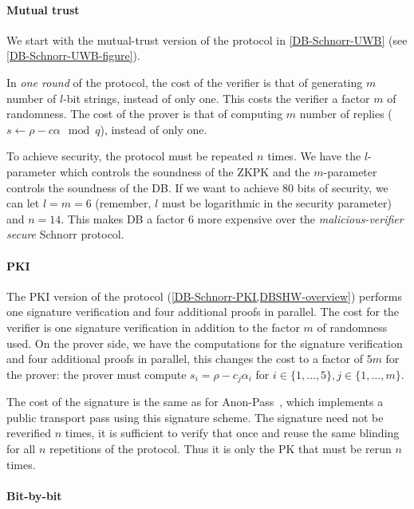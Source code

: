 \paragraph*{Mutual trust}

We start with the mutual-trust version of the protocol in \cref{DB-Schnorr-UWB} 
(see \cref{DB-Schnorr-UWB-figure}).

In \emph{one round} of the protocol, the cost of the verifier is that of 
generating \(m\) number of \(l\)-bit strings, instead of only one.
This costs the verifier a factor \(m\) of randomness.
The cost of the prover is that of computing \(m\) number of replies (\(s\gets 
\rho - c \alpha \mod q\)), instead of only one.

To achieve security, the protocol must be repeated \(n\) times.
We have the \(l\)-parameter which controls the soundness of the \ac{ZKPK} and 
the \(m\)-parameter controls the soundness of the \acl{DB}.
If we want to achieve 80 bits of security, we can let \(l = m = 6\) (remember, 
\(l\) must be logarithmic in the security parameter) and \(n = 14\).
This makes \acl{DB} a factor \(6\) more expensive over the 
\emph{malicious-verifier secure} Schnorr protocol.

\paragraph*{\acs*{PKI}}

The \ac{PKI} version of the protocol (\cref{DB-Schnorr-PKI,DBSHW-overview}) 
performs one signature verification and four additional proofs in parallel.
The cost for the verifier is one signature verification in addition to the 
factor \(m\) of randomness used.
On the prover side, we have the computations for the signature verification and 
four additional proofs in parallel, this changes the cost to a factor of \(5m\) 
for the prover: the prover must compute \(s_i = \rho - c_j \alpha_i\) for 
\(i\in \{1, \dotsc, 5\}, j\in \{1, \dotsc, m\}\).

The cost of the signature is the same as for Anon-Pass~\cite{AnonPass}, which 
implements a public transport pass using this signature scheme.
The signature need not be reverified \(n\) times, it is sufficient to verify 
that once and reuse the same blinding for all \(n\) repetitions of the 
protocol.
Thus it is only the \acl{PK} that must be rerun \(n\) times.

\paragraph*{Bit-by-bit}

